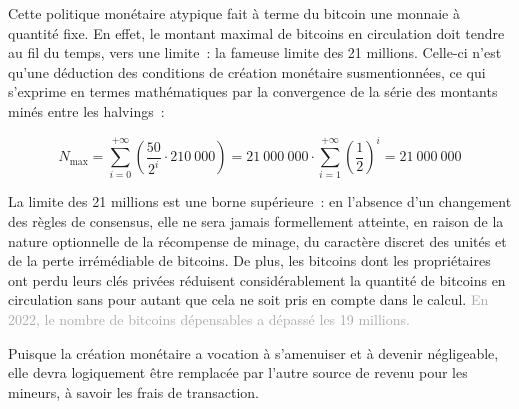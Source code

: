 %
% 
% 


Cette politique monétaire atypique fait à terme du bitcoin une monnaie à quantité fixe. En effet, le montant maximal de bitcoins en circulation doit tendre au fil du temps, vers une limite~: la fameuse limite des 21 millions. Celle-ci n'est qu'une déduction des conditions de création monétaire susmentionnées, ce qui s'exprime en termes mathématiques par la convergence de la série des montants minés entre les halvings~:

{ \small
\[
N_{\mathrm{max}} = \sum_{i=0}^{+\infty} \left( {\frac{50}{2^i} \cdot 210~000} \right) = 21~000~000 \cdot \sum_{i=1}^{+\infty} \left(\frac{1}{2}\right)^i = 21~000~000
\]
}

La limite des 21 millions est une borne supérieure~: en l'absence d'un changement des règles de consensus, elle ne sera jamais formellement atteinte, en raison de la nature optionnelle de la récompense de minage, du caractère discret des unités et de la perte irrémédiable de bitcoins. De plus, les bitcoins dont les propriétaires ont perdu leurs clés privées réduisent considérablement la quantité de bitcoins en circulation sans pour autant que cela ne soit pris en compte dans le calcul. \textcolor{darkgray}{En 2022, le nombre de bitcoins dépensables a dépassé les 19 millions.}

Puisque la création monétaire a vocation à s'amenuiser et à devenir négligeable, elle devra logiquement être remplacée par l'autre source de revenu pour les mineurs, à savoir les frais de transaction.

